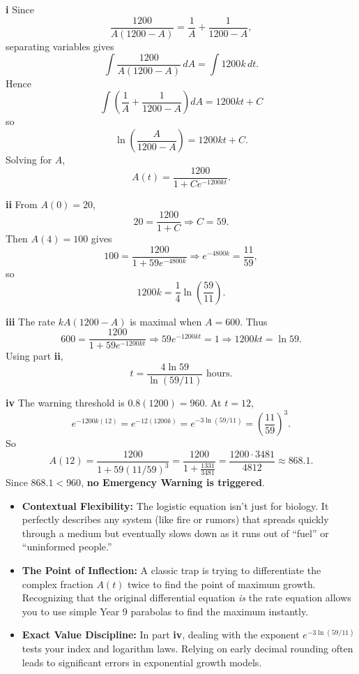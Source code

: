 \begin{solution}
\textbf{i} Since
\[
\frac{1200}{A(1200-A)}=\frac1A+\frac{1}{1200-A},
\]
separating variables gives
\[
\int \frac{1200}{A(1200-A)}\,dA=\int 1200k\,dt.
\]
Hence
\[
\int\left(\frac1A+\frac{1}{1200-A}\right)dA=1200kt+C
\]
so
\[
\ln\left(\frac{A}{1200-A}\right)=1200kt+C.
\]
Solving for $A$,
\[
\boxed{A(t)=\frac{1200}{1+Ce^{-1200kt}}}.
\]

\textbf{ii} From $A(0)=20$,
\[
20=\frac{1200}{1+C}\Rightarrow C=59.
\]
Then $A(4)=100$ gives
\[
100=\frac{1200}{1+59e^{-4800k}}
\Rightarrow e^{-4800k}=\frac{11}{59},
\]
so
\[
\boxed{1200k=\frac14\ln\left(\frac{59}{11}\right)}.
\]

\textbf{iii} The rate $kA(1200-A)$ is maximal when $A=600$. Thus
\[
600=\frac{1200}{1+59e^{-1200kt}}
\Rightarrow 59e^{-1200kt}=1
\Rightarrow 1200kt=\ln 59.
\]
Using part \textbf{ii},
\[
\boxed{t=\frac{4\ln 59}{\ln(59/11)}\text{ hours}}.
\]

\textbf{iv} The warning threshold is $0.8(1200)=960$. At $t=12$,
\[
e^{-1200k(12)}=e^{-12(1200k)}=e^{-3\ln(59/11)}=\left(\frac{11}{59}\right)^3.
\]
So
\[
A(12)=\frac{1200}{1+59(11/59)^3}
=\frac{1200}{1+\frac{1331}{3481}}
=\frac{1200\cdot 3481}{4812}\approx 868.1.
\]
Since $868.1<960$, \textbf{no Emergency Warning is triggered}.
\end{solution}

\begin{takeaways}
\begin{itemize}[leftmargin=*]
    \item \textbf{Contextual Flexibility:} The logistic equation isn't just for biology. It perfectly describes any system (like fire or rumors) that spreads quickly through a medium but eventually slows down as it runs out of ``fuel'' or ``uninformed people.''
    \item \textbf{The Point of Inflection:} A classic trap is trying to differentiate the complex fraction $A(t)$ twice to find the point of maximum growth. Recognizing that the original differential equation \textit{is} the rate equation allows you to use simple Year 9 parabolas to find the maximum instantly.
    \item \textbf{Exact Value Discipline:} In part \textbf{iv}, dealing with the exponent $e^{-3\ln(59/11)}$ tests your index and logarithm laws. Relying on early decimal rounding often leads to significant errors in exponential growth models.
\end{itemize}
\end{takeaways}

